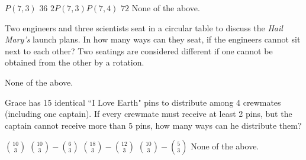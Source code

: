 \documentclass[11pt,addpoints]{exam}
\begin{document}
\begin{questions}
\begin{choices}
    \choice $P(7,3)$
    \choice $36$
    \choice $2P(7,3)P(7,4)$
    \choice $72$ %
    \choice None of the above.
\end{choices}




\question[5] Two engineers and three scientists seat in a circular table to discuss the \textit{Hail Mary's} launch plans. In how many ways can they seat, if the engineers cannot sit next to each other? Two seatings are considered different if one cannot be obtained from the other by a rotation.




    \begin{choices}
    \choice None of the above.
\end{choices}






\question[5] Grace has 15 identical ``I Love Earth" pins to distribute among 4 crewmates (including one captain). If every crewmate must receive at least 2 pins, but the captain cannot receive more than 5 pins, how many ways can he distribute them?

\begin{choices}
    \choice $\binom{10}{3}$
    \choice $\binom{10}{3} - \binom{6}{3}$ %
    \choice $\binom{18}{3} - \binom{12}{3}$
    \choice $\binom{10}{3} - \binom{5}{3}$
    \choice None of the above.
\end{choices}


\end{questions}
\end{document}
